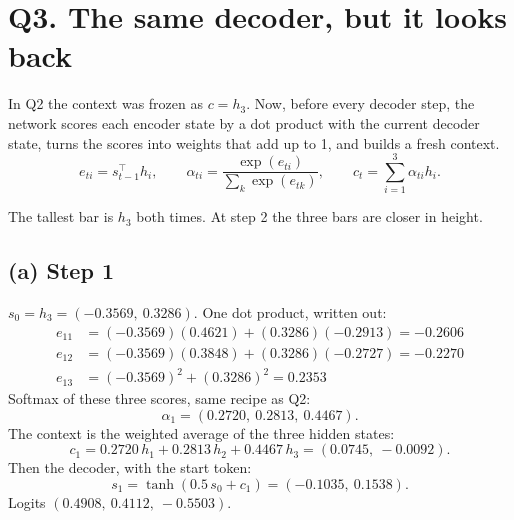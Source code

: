 \documentclass[11pt,a4paper]{article}
\begin{document}
\section{Q3. The same decoder, but it looks back}

\begin{idea}
In Q2 the context was frozen as \(c=h_3\). Now, before every decoder step, the network scores each encoder state by a dot product with the current decoder state, turns the scores into weights that add up to 1, and builds a fresh context.
\[
e_{ti}=s_{t-1}^\top h_i,\qquad
\alpha_{ti}=\frac{\exp(e_{ti})}{\sum_k \exp(e_{tk})},\qquad
c_t=\sum_{i=1}^{3}\alpha_{ti}h_i.
\]
\end{idea}

\begin{center}
\end{center}

The tallest bar is \(h_3\) both times. At step 2 the three bars are closer in height.

\subsection{(a) Step 1}

\(s_0=h_3=(-0.3569,\ 0.3286)\). One dot product, written out:
\begin{align*}
e_{11}&=(-0.3569)(0.4621)+(0.3286)(-0.2913)=-0.2606\\
e_{12}&=(-0.3569)(0.3848)+(0.3286)(-0.2727)=-0.2270\\
e_{13}&=(-0.3569)^2+(0.3286)^2=0.2353
\end{align*}
Softmax of these three scores, same recipe as Q2:
\[
\alpha_1=(0.2720,\ 0.2813,\ 0.4467).
\]
The context is the weighted average of the three hidden states:
\[
c_1=0.2720\,h_1+0.2813\,h_2+0.4467\,h_3=(0.0745,\ -0.0092).
\]
Then the decoder, with the start token:
\[
s_1=\tanh(0.5\,s_0+c_1)=(-0.1035,\ 0.1538).
\]
Logits \((0.4908,\ 0.4112,\ -0.5503)\).
\end{document}
